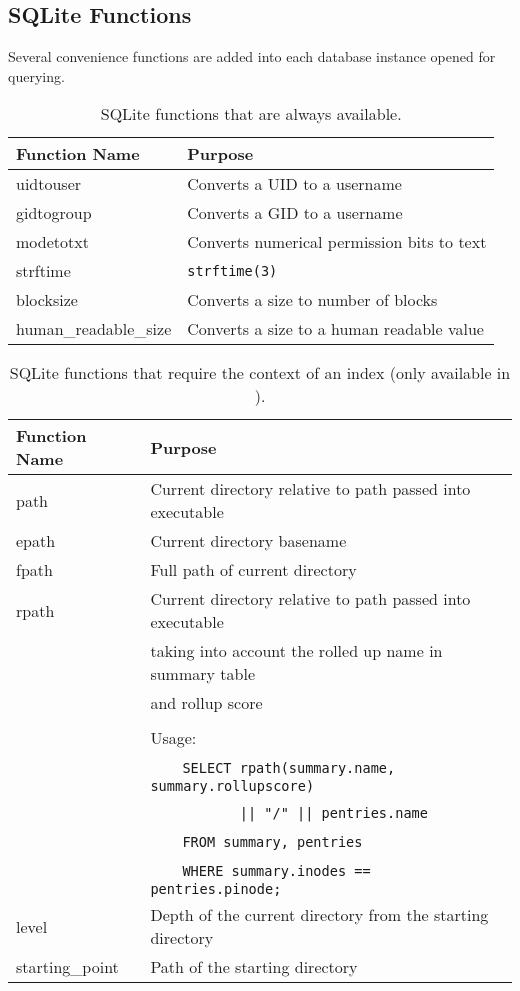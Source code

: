 \clearpage
\subsection{SQLite Functions}
Several convenience functions are added into each database instance
opened for querying.

\begin{table}[htb]
  \centering
  \begin{tabular}{| l | l |}
    \hline
    Function Name & Purpose \\
    \hline
    uidtouser & Converts a UID to a username \\
    \hline
    gidtogroup & Converts a GID to a username \\
    \hline
    modetotxt & Converts numerical permission bits to text \\
    \hline
    strftime & \texttt{strftime(3)} \\
    \hline
    blocksize & Converts a size to number of blocks \\
    \hline
    human\_readable\_size & Converts a size to a human readable value \\
    \hline
  \end{tabular}
  \caption{SQLite functions that are always available.}
\end{table}

\begin{table}[htb]
  \centering
  \begin{tabular}{| l | l |}
    \hline
    Function Name & Purpose \\
    \hline
    path & Current directory relative to path passed into executable \\
    \hline
    epath & Current directory basename \\
    \hline
    fpath & Full path of current directory \\
    \hline
    rpath & Current directory relative to path passed into executable \\
          & taking into account the rolled up name in summary table \\
          & and rollup score \\
          & \\
          & Usage: \\
          & \ \ \ \ \texttt{SELECT rpath(summary.name, summary.rollupscore)} \\
          & \ \ \ \ \texttt{\ \ \ \ \ \ \ || "/" || pentries.name} \\
          & \ \ \ \ \texttt{FROM summary, pentries} \\
          & \ \ \ \ \texttt{WHERE summary.inodes == pentries.pinode;} \\
    \hline
    level & Depth of the current directory from the starting directory \\
    \hline
    starting\_point & Path of the starting directory \\
    \hline
  \end{tabular}
  \caption{SQLite functions that require the context of an index (only
    available in \gufiquery).}
\end{table}
\clearpage
